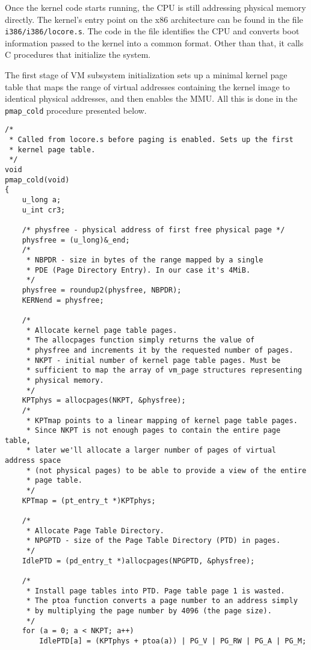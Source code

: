 \documentclass[shortabstract, english]{iithesis}
\newenvironment{code}{}{}
\begin{document}
Once the kernel code starts running, the CPU is still addressing physical memory
directly. The kernel's entry point on the x86 architecture can be found in the
file \texttt{i386/i386/locore.s}. The code in the file identifies the CPU and
converts boot information passed to the kernel into a common format. Other than
that, it calls C procedures that initialize the system.

The first stage of VM subsystem initialization sets up a minimal kernel page
table that maps the range of virtual addresses containing the kernel image to
identical physical addresses, and then enables the MMU. All this is done in the
\texttt{pmap_cold} procedure presented below.

\begin{code}
\begin{verbatim}
/*
 * Called from locore.s before paging is enabled. Sets up the first
 * kernel page table.
 */
void
pmap_cold(void)
{
    u_long a;
    u_int cr3;

    /* physfree - physical address of first free physical page */
    physfree = (u_long)&_end;
    /*
     * NBPDR - size in bytes of the range mapped by a single
     * PDE (Page Directory Entry). In our case it's 4MiB.
     */
    physfree = roundup2(physfree, NBPDR);
    KERNend = physfree;

    /*
     * Allocate kernel page table pages.
     * The allocpages function simply returns the value of
     * physfree and increments it by the requested number of pages.
     * NKPT - initial number of kernel page table pages. Must be
     * sufficient to map the array of vm_page structures representing
     * physical memory.
     */
    KPTphys = allocpages(NKPT, &physfree);
    /*
     * KPTmap points to a linear mapping of kernel page table pages.
     * Since NKPT is not enough pages to contain the entire page table,
     * later we'll allocate a larger number of pages of virtual address space
     * (not physical pages) to be able to provide a view of the entire
     * page table.
     */
    KPTmap = (pt_entry_t *)KPTphys;

    /*
     * Allocate Page Table Directory.
     * NPGPTD - size of the Page Table Directory (PTD) in pages.
     */
    IdlePTD = (pd_entry_t *)allocpages(NPGPTD, &physfree);

    /*
     * Install page tables into PTD. Page table page 1 is wasted.
     * The ptoa function converts a page number to an address simply
     * by multiplying the page number by 4096 (the page size).
     */
    for (a = 0; a < NKPT; a++)
        IdlePTD[a] = (KPTphys + ptoa(a)) | PG_V | PG_RW | PG_A | PG_M;


\end{verbatim}
\end{code}
\end{document}
